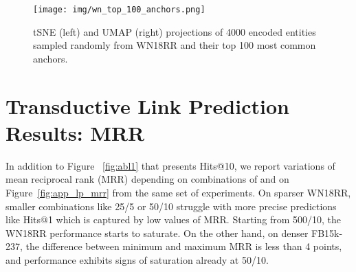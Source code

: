 \documentclass{article} \usepackage{iclr2022_conference,times}
\begin{document}
\begin{figure}[!htb]
    \centering
    \texttt{[image: img/wn\_top\_100\_anchors.png]}
    \caption{tSNE (left) and UMAP (right) projections of 4000 encoded entities sampled randomly from WN18RR and their top 100 most common anchors.}
    \label{fig:wn_top_anchors}
\end{figure}



\section{Transductive Link Prediction Results: MRR}
\label{app:tr_lp}

In addition to Figure ~\ref{fig:abl1} that presents Hits@10, we report variations of mean reciprocal rank (MRR) depending on combinations of  and  on Figure~\ref{fig:app_lp_mrr} from the same set of experiments. 
On sparser WN18RR, smaller  combinations like 25/5 or 50/10 struggle with more precise predictions like Hits@1 which is captured by low values of MRR. 
Starting from 500/10, the WN18RR performance starts to saturate. On the other hand, on denser FB15k-237, the difference between minimum and maximum MRR is less than 4 points, and performance exhibits signs of saturation already at 50/10.
\end{document}
